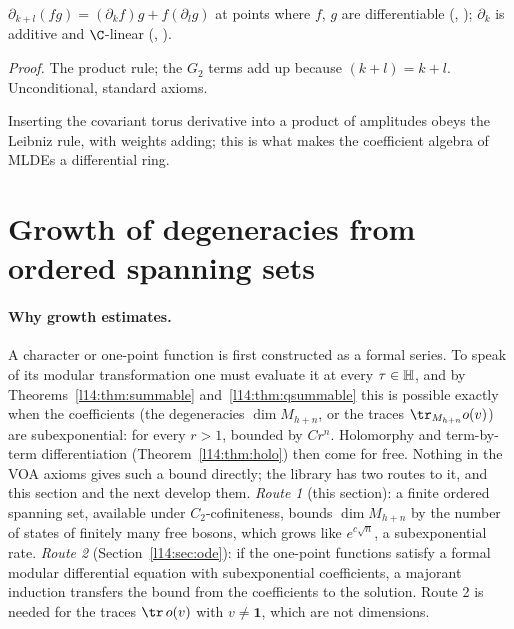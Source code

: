 \begin{proposition}\label{l14:prop:serremul}
$\partial_{k+l}(fg) = (\partial_kf)g + f(\partial_lg)$ at points where $f$, $g$ are differentiable
(, ); $\partial_k$ is additive and $\C$-linear
(, ).
\end{proposition}
\noindent\emph{Proof.} The product rule; the $G_2$ terms add up because $(k+l) = k + l$. Unconditional, standard axioms.
\begin{physics}
Inserting the covariant torus derivative into a product of amplitudes obeys the Leibniz rule, with weights adding; this is what makes the coefficient algebra of MLDEs a differential ring.
\end{physics}

\section{Growth of degeneracies from ordered spanning sets}\label{l14:sec:growth}

\paragraph{Why growth estimates.} A character or one-point function is first constructed as a formal series. To speak of its
modular transformation one must evaluate it at every $\tau\in\mathbb{H}$, and by Theorems~\ref{l14:thm:summable}
and~\ref{l14:thm:qsummable} this is possible exactly when the coefficients (the degeneracies $\dim M_{h+n}$, or the traces
$\tr_{M_{h+n}}o(v)$) are subexponential: for every $r>1$, bounded by $Cr^n$. Holomorphy and term-by-term differentiation
(Theorem~\ref{l14:thm:holo}) then come for free. Nothing in the VOA axioms gives such a bound directly; the library has two
routes to it, and this section and the next develop them. \emph{Route 1} (this section): a finite ordered spanning set,
available under $C_2$-cofiniteness, bounds $\dim M_{h+n}$ by the number of states of finitely many free bosons, which grows like
$e^{c\sqrt n}$, a subexponential rate. \emph{Route 2} (Section~\ref{l14:sec:ode}): if the one-point functions satisfy a formal
modular differential equation with subexponential coefficients, a majorant induction transfers the bound from the
coefficients to the solution. Route 2 is needed for the traces $\tr\,o(v)$ with $v\neq\mathbf 1$, which are not dimensions.

